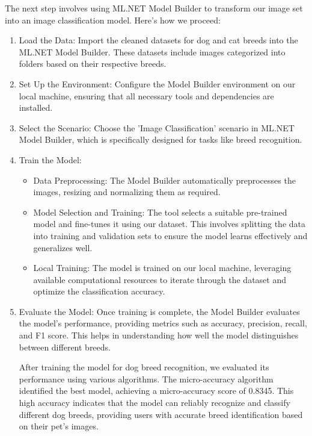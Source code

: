 The next step involves using ML.NET Model Builder to transform our image set into an image classification model. Here's how we proceed:
\begin{enumerate}
    \item Load the Data: Import the cleaned datasets for dog and cat breeds into the ML.NET Model Builder. These datasets include images
          categorized into folders based on their respective breeds.
    \item Set Up the Environment: Configure the Model Builder environment on our local machine, ensuring that all necessary tools and dependencies are installed.
    \item Select the Scenario: Choose the 'Image Classification' scenario in ML.NET Model Builder, which is specifically designed for tasks like breed recognition.
    \item Train the Model:
          \begin{itemize}
              \item Data Preprocessing: The Model Builder automatically preprocesses the images, resizing and normalizing them as required.
              \item Model Selection and Training: The tool selects a suitable pre-trained model and fine-tunes it using our dataset. This involves
                    splitting the data into training and validation sets to ensure the model learns effectively and generalizes well.
              \item Local Training: The model is trained on our local machine, leveraging available computational resources to iterate through
                    the dataset and optimize the classification accuracy.
          \end{itemize}
    \item Evaluate the Model: Once training is complete, the Model Builder evaluates the model's performance,
          providing metrics such as accuracy, precision, recall, and F1 score. This helps in understanding how well
          the model distinguishes between different breeds.

          After training the model for dog breed recognition, we evaluated its performance using various algorithms.
          The micro-accuracy algorithm identified the best model, achieving a micro-accuracy score of 0.8345. This
          high accuracy indicates that the model can reliably recognize and classify different dog breeds, providing
          users with accurate breed identification based on their pet's images.


\end{enumerate}
